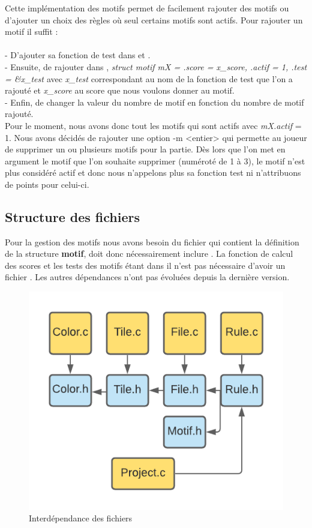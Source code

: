 \documentclass[a4paper]{article}
\begin{document}
Cette implémentation des motifs permet de facilement rajouter des motifs ou d'ajouter un choix des règles où seul certains motifs sont actifs. 
Pour rajouter un motif il suffit : \\ \\
- D'ajouter sa fonction de test dans  et . \\
- Ensuite, de rajouter dans ,  \emph{struct motif mX = { .score = {x\_score}, .actif = 1, .test = \&{x\_test} }} avec \emph{{x\_test}} correspondant au nom de la fonction de test que l'on a rajouté et \emph{{x\_score}} au score que nous voulons donner au motif. \\
- Enfin, de changer la valeur du nombre de motif en fonction du nombre de motif rajouté. \\
\newline
Pour le moment, nous avons donc tout les motifs qui sont actifs avec \emph{mX.actif} = 1. Nous avons décidés de rajouter une option -m  <entier> qui permette au joueur de supprimer un ou plusieurs motifs pour la partie. Dès lors que l'on met en argument le motif que l'on souhaite supprimer (numéroté de 1 à 3), le motif n'est plus considéré actif et donc nous n'appelons plus sa fonction test ni n'attribuons de points pour celui-ci.

\subsection{Structure des fichiers}

Pour la gestion des motifs nous avons besoin du fichier  qui contient la définition de la structure \textbf{motif},  doit donc nécessairement inclure . La fonction de calcul des scores et les tests des motifs étant dans  il n'est pas nécessaire d'avoir un fichier . Les autres dépendances n'ont pas évoluées depuis la dernière version.
\newpage

\begin{figure}[h!]
  \centering
  \includegraphics[scale = 0.75]{fichiers2.png}

  \caption{Interdépendance des fichiers}
  \label{fichier2}
\end{figure}
\end{document}

